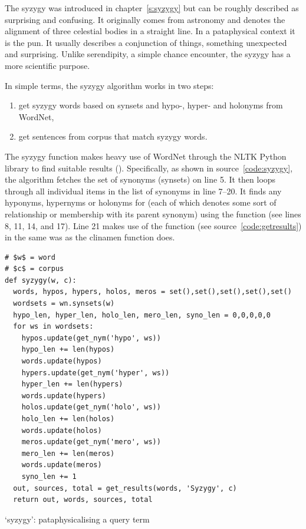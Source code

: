 The syzygy was introduced in chapter~\ref{s:syzygy} but can be roughly described as surprising and confusing. It originally comes from astronomy and denotes the alignment of three celestial bodies in a straight line. In a pataphysical context it is the pun. It usually describes a conjunction of things, something unexpected and surprising. Unlike serendipity, a simple chance encounter, the syzygy has a more scientific purpose.

In simple terms, the syzygy algorithm works in two steps:
\begin{enumerate}
  \item get syzygy words based on synsets and hypo-, hyper- and holonyms from WordNet,
  \item get sentences from corpus that match syzygy words.
\end{enumerate}

The syzygy function makes heavy use of WordNet \autocite{Miller1995} through the \ac{NLTK} Python library \autocite{NLTK2016} to find suitable results (). Specifically, as shown in source~\ref{code:syzygy}, the algorithm fetches the set of synonyms (synsets) on line 5. It then loops through all individual items  in the list of synonyms  in line 7--20. It finds any hyponyms, hypernyms or holonyms for  (each of which denotes some sort of relationship or membership with its parent synonym) using the  function (see lines 8, 11, 14, and 17). Line 21 makes use of the  function (see source~\ref{code:getresults}) in the same was as the clinamen function does.

\begin{listing}
  \begin{verbatim}
# $w$ = word
# $c$ = corpus
def syzygy(w, c):
  words, hypos, hypers, holos, meros = set(),set(),set(),set(),set()
  wordsets = wn.synsets(w)
  hypo_len, hyper_len, holo_len, mero_len, syno_len = 0,0,0,0,0
  for ws in wordsets:
    hypos.update(get_nym('hypo', ws))
    hypo_len += len(hypos)
    words.update(hypos)
    hypers.update(get_nym('hyper', ws))
    hyper_len += len(hypers)
    words.update(hypers)
    holos.update(get_nym('holo', ws))
    holo_len += len(holos)
    words.update(holos)
    meros.update(get_nym('mero', ws))
    mero_len += len(meros)
    words.update(meros)
    syno_len += 1
  out, sources, total = get_results(words, 'Syzygy', c)
  return out, words, sources, total
  \end{verbatim}
\caption[`syzygy' function]{`syzygy': pataphysicalising a query term}
\label{code:syzygy}
\end{listing}

